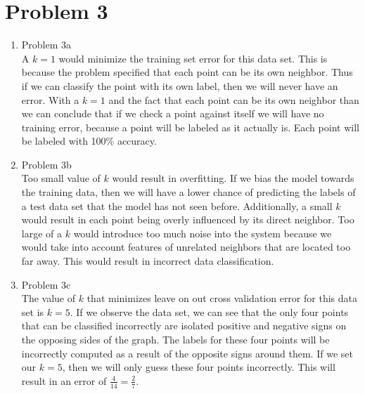 \documentclass[11pt]{article}
\newcommand{\solution}[1]{{{\color{blue}{\bf Solution:} {#1}}}}
\begin{document}
\section{Problem 3}
\begin{enumerate}
\item Problem 3a \\
\solution{}
A $k=1$ would minimize the training set error for this data set. This is because the problem specified that each point can be its own neighbor. Thus if we can classify the point with its own label, then we will never have an error. With a $k=1$ and the fact that each point can be its own neighbor than we can conclude that if we check a point against itself we will have no training error, because a point will be labeled as it actually is. Each point will be labeled with 100\% accuracy. 
\item Problem 3b \\
\solution{}
Too small value of $k$ would result in overfitting. If we bias the model towards the training data, then we will have a lower chance of predicting the labels of a test data set that the model has not seen before. Additionally, a small $k$ would result in each point being overly influenced by its direct neighbor. Too large of a $k$ would introduce too much noise into the system because we would take into account features of unrelated neighbors that are located too far away. This would result in incorrect data classification.
\item Problem 3c \\
\solution{}
The value of $k$ that minimizes leave on out cross validation error for this data set is $k=5$. If we observe the data set, we can see that the only four points that can be classified incorrectly are isolated positive and negative signs on the opposing sides of the graph. The labels for these four points will be incorrectly computed as a result of the opposite signs around them. If we set our $k=5$, then we will only guess these four points incorrectly. This will result in an error of $\frac{4}{14}=\frac{2}{7}$.
\end{enumerate}
\newpage
\end{document}

